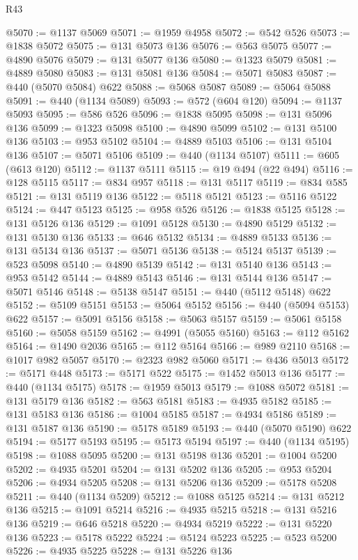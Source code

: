 \begin{lexlean}{R43}
\begin{coremodule}
@5070 := @1137 @5069
@5071 := @1959 @4958
@5072 := @542 @526
@5073 := @1838 @5072
@5075 := @131 @5073 @136
@5076 := @563 @5075
@5077 := @4890 @5076
@5079 := @131 @5077 @136
@5080 := @1323 @5079
@5081 := @4889 @5080
@5083 := @131 @5081 @136
@5084 := @5071 @5083
@5087 := @440 (@5070 @5084) @622
@5088 := @5068 @5087
@5089 := @5064 @5088
@5091 := @440 (@1134 @5089)
@5093 := @572 (@604 @120)
@5094 := @1137 @5093
@5095 := @586 @526
@5096 := @1838 @5095
@5098 := @131 @5096 @136
@5099 := @1323 @5098
@5100 := @4890 @5099
@5102 := @131 @5100 @136
@5103 := @953 @5102
@5104 := @4889 @5103
@5106 := @131 @5104 @136
@5107 := @5071 @5106
@5109 := @440 (@1134 @5107)
@5111 := @605 (@613 @120)
@5112 := @1137 @5111
@5115 := @19 @494 (@22 @494)
@5116 := @128 @5115
@5117 := @834 @957
@5118 := @131 @5117
@5119 := @834 @585
@5121 := @131 @5119 @136
@5122 := @5118 @5121
@5123 := @5116 @5122
@5124 := @447 @5123
@5125 := @958 @526
@5126 := @1838 @5125
@5128 := @131 @5126 @136
@5129 := @1091 @5128
@5130 := @4890 @5129
@5132 := @131 @5130 @136
@5133 := @646 @5132
@5134 := @4889 @5133
@5136 := @131 @5134 @136
@5137 := @5071 @5136
@5138 := @5124 @5137
@5139 := @523 @5098
@5140 := @4890 @5139
@5142 := @131 @5140 @136
@5143 := @953 @5142
@5144 := @4889 @5143
@5146 := @131 @5144 @136
@5147 := @5071 @5146
@5148 := @5138 @5147
@5151 := @440 (@5112 @5148) @622
@5152 := @5109 @5151
@5153 := @5064 @5152
@5156 := @440 (@5094 @5153) @622
@5157 := @5091 @5156
@5158 := @5063 @5157
@5159 := @5061 @5158
@5160 := @5058 @5159
@5162 := @4991 (@5055 @5160)
@5163 := @112 @5162
@5164 := @1490 @2036
@5165 := @112 @5164
@5166 := @989 @2110
@5168 := @1017 @982 @5057
@5170 := @2323 @982 @5060
@5171 := @436 @5013
@5172 := @5171 @448
@5173 := @5171 @522
@5175 := @1452 @5013 @136
@5177 := @440 (@1134 @5175)
@5178 := @1959 @5013
@5179 := @1088 @5072
@5181 := @131 @5179 @136
@5182 := @563 @5181
@5183 := @4935 @5182
@5185 := @131 @5183 @136
@5186 := @1004 @5185
@5187 := @4934 @5186
@5189 := @131 @5187 @136
@5190 := @5178 @5189
@5193 := @440 (@5070 @5190) @622
@5194 := @5177 @5193
@5195 := @5173 @5194
@5197 := @440 (@1134 @5195)
@5198 := @1088 @5095
@5200 := @131 @5198 @136
@5201 := @1004 @5200
@5202 := @4935 @5201
@5204 := @131 @5202 @136
@5205 := @953 @5204
@5206 := @4934 @5205
@5208 := @131 @5206 @136
@5209 := @5178 @5208
@5211 := @440 (@1134 @5209)
@5212 := @1088 @5125
@5214 := @131 @5212 @136
@5215 := @1091 @5214
@5216 := @4935 @5215
@5218 := @131 @5216 @136
@5219 := @646 @5218
@5220 := @4934 @5219
@5222 := @131 @5220 @136
@5223 := @5178 @5222
@5224 := @5124 @5223
@5225 := @523 @5200
@5226 := @4935 @5225
@5228 := @131 @5226 @136

\end{coremodule}
\end{lexlean}
